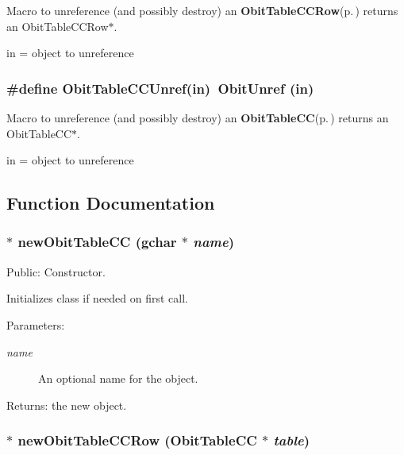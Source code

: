 Macro to unreference (and possibly destroy) an {\bf Obit\-Table\-CCRow}{\rm (p.\,\pageref{structObitTableCCRow})} returns an Obit\-Table\-CCRow$\ast$. 

in = object to unreference 
\subsubsection{\setlength{\rightskip}{0pt plus 5cm}\#define Obit\-Table\-CCUnref(in)\ Obit\-Unref (in)}\label{ObitTableCC_8h_a1}


Macro to unreference (and possibly destroy) an {\bf Obit\-Table\-CC}{\rm (p.\,\pageref{structObitTableCC})} returns an Obit\-Table\-CC$\ast$. 

in = object to unreference 

\subsection{Function Documentation}
\subsubsection{$\ast$ new\-Obit\-Table\-CC (gchar $\ast$ {\em name})}\label{ObitTableCC_8h_a11}


Public: Constructor. 

Initializes class if needed on first call. \begin{Desc}
\item[Parameters:]
\begin{description}
\item[{\em name}]An optional name for the object. \end{description}
\end{Desc}
\begin{Desc}
\item[Returns:]the new object. \end{Desc}
\subsubsection{$\ast$ new\-Obit\-Table\-CCRow ({\bf Obit\-Table\-CC} $\ast$ {\em table})}\label{ObitTableCC_8h_a8}


